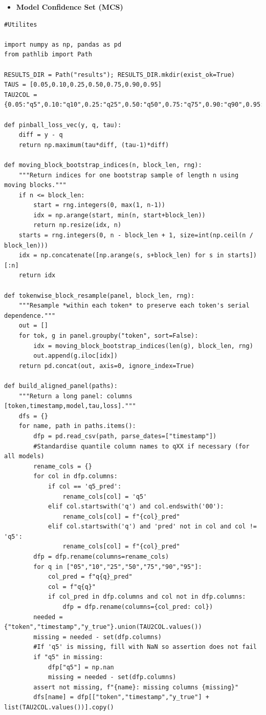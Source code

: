 \documentclass[
  a4paper,
  DIV=11,
  numbers=noendperiod]{scrreprt}
\providecommand{\tightlist}{%
  \setlength{\itemsep}{0pt}\setlength{\parskip}{0pt}}
\begin{document}
\begin{itemize}
\tightlist
\item
  \textbf{Model Confidence Set (MCS)}
\end{itemize}

\begin{verbatim}
#Utilites

import numpy as np, pandas as pd
from pathlib import Path

RESULTS_DIR = Path("results"); RESULTS_DIR.mkdir(exist_ok=True)
TAUS = [0.05,0.10,0.25,0.50,0.75,0.90,0.95]
TAU2COL = {0.05:"q5",0.10:"q10",0.25:"q25",0.50:"q50",0.75:"q75",0.90:"q90",0.95:"q95"}

def pinball_loss_vec(y, q, tau):
    diff = y - q
    return np.maximum(tau*diff, (tau-1)*diff)

def moving_block_bootstrap_indices(n, block_len, rng):
    """Return indices for one bootstrap sample of length n using moving blocks."""
    if n <= block_len:
        start = rng.integers(0, max(1, n-1))
        idx = np.arange(start, min(n, start+block_len))
        return np.resize(idx, n)
    starts = rng.integers(0, n - block_len + 1, size=int(np.ceil(n / block_len)))
    idx = np.concatenate([np.arange(s, s+block_len) for s in starts])[:n]
    return idx

def tokenwise_block_resample(panel, block_len, rng):
    """Resample *within each token* to preserve each token's serial dependence."""
    out = []
    for tok, g in panel.groupby("token", sort=False):
        idx = moving_block_bootstrap_indices(len(g), block_len, rng)
        out.append(g.iloc[idx])
    return pd.concat(out, axis=0, ignore_index=True)

def build_aligned_panel(paths):
    """Return a long panel: columns [token,timestamp,model,tau,loss]."""
    dfs = {}
    for name, path in paths.items():
        dfp = pd.read_csv(path, parse_dates=["timestamp"])
        #Standardise quantile column names to qXX if necessary (for all models)
        rename_cols = {}
        for col in dfp.columns:
            if col == 'q5_pred':
                rename_cols[col] = 'q5'
            elif col.startswith('q') and col.endswith('00'):
                rename_cols[col] = f"{col}_pred"
            elif col.startswith('q') and 'pred' not in col and col != 'q5':
                rename_cols[col] = f"{col}_pred"
        dfp = dfp.rename(columns=rename_cols)
        for q in ["05","10","25","50","75","90","95"]:
            col_pred = f"q{q}_pred"
            col = f"q{q}"
            if col_pred in dfp.columns and col not in dfp.columns:
                dfp = dfp.rename(columns={col_pred: col})
        needed = {"token","timestamp","y_true"}.union(TAU2COL.values())
        missing = needed - set(dfp.columns)
        #If 'q5' is missing, fill with NaN so assertion does not fail
        if "q5" in missing:
            dfp["q5"] = np.nan
            missing = needed - set(dfp.columns)
        assert not missing, f"{name}: missing columns {missing}"
        dfs[name] = dfp[["token","timestamp","y_true"] + list(TAU2COL.values())].copy()


\end{verbatim}
\end{document}
